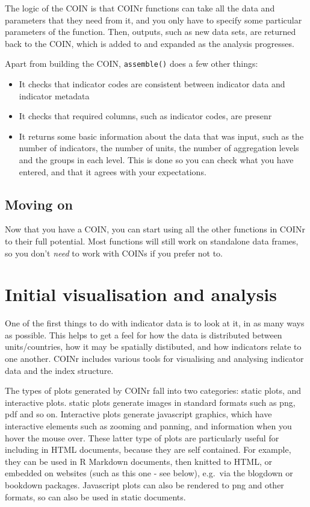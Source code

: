 \documentclass[
]{book}
\providecommand{\tightlist}{%
  \setlength{\itemsep}{0pt}\setlength{\parskip}{0pt}}
\begin{document}
The logic of the COIN is that COINr functions can take all the data and parameters that they need from it, and you only have to specify some particular parameters of the function. Then, outputs, such as new data sets, are returned back to the COIN, which is added to and expanded as the analysis progresses.

Apart from building the COIN, \texttt{assemble()} does a few other things:

\begin{itemize}
\tightlist
\item
  It checks that indicator codes are consistent between indicator data and indicator metadata
\item
  It checks that required columns, such as indicator codes, are presenr
\item
  It returns some basic information about the data that was input, such as the number of indicators, the number of units, the number of aggregation levels and the groups in each level. This is done so you can check what you have entered, and that it agrees with your expectations.
\end{itemize}

\hypertarget{moving-on}{%
\section{Moving on}\label{moving-on}}

Now that you have a COIN, you can start using all the other functions in COINr to their full potential. Most functions will still work on standalone data frames, so you don't \emph{need} to work with COINs if you prefer not to.

\hypertarget{initial-visualisation-and-analysis}{%
\chapter{Initial visualisation and analysis}\label{initial-visualisation-and-analysis}}

One of the first things to do with indicator data is to look at it, in as many ways as possible. This helps to get a feel for how the data is distributed between units/countries, how it may be spatially distibuted, and how indicators relate to one another. COINr includes various tools for visualising and analysing indicator data and the index structure.

The types of plots generated by COINr fall into two categories: static plots, and interactive plots. static plots generate images in standard formats such as png, pdf and so on. Interactive plots generate javascript graphics, which have interactive elements such as zooming and panning, and information when you hover the mouse over. These latter type of plots are particularly useful for including in HTML documents, because they are self contained. For example, they can be used in R Markdown documents, then knitted to HTML, or embedded on websites (such as this one - see below), e.g.~via the blogdown or bookdown packages. Javascript plots can also be rendered to png and other formats, so can also be used in static documents.
\end{document}
